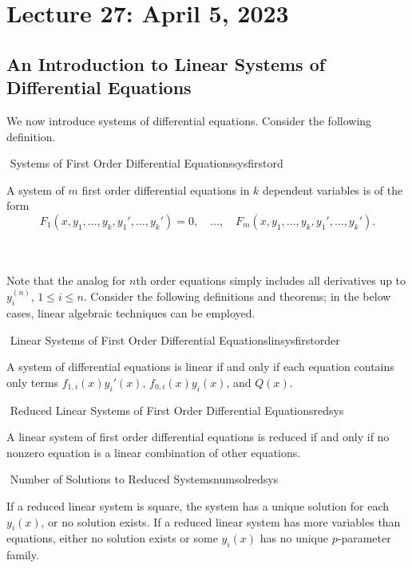 \section{Lecture 27: April 5, 2023}

    \subsection{An Introduction to Linear Systems of Differential Equations}

    We now introduce systems of differential equations. Consider the following definition.
    \begin{definition}{\Stop\,\,Systems of First Order Differential Equations}{sysfirstord}

        A system of \(m\) first order differential equations in \(k\) dependent variables is of the form
        \begin{equation*}
            F_1(x,y_1,\ldots,y_k,y_1',\ldots,y_k')=0,\quad \ldots,\quad F_m(x,y_1,\ldots,y_k,y_1',\ldots,y_k').
        \end{equation*}
        
    \end{definition}
    \vphantom
    \\
    \\
    Note that the analog for \(n\)th order equations simply includes all derivatives up to \(y_i^{(n)}\), \(1\leq i\leq n\). Consider the following definitions and theorems; in the below cases, linear algebraic techniques can be employed.
    \begin{definition}{\Stop\,\,Linear Systems of First Order Differential Equations}{linsysfirstorder}

        A system of differential equations is linear if and only if each equation contains only terms \(f_{1,i}(x)y_i'(x)\), \(f_{0,i}(x)y_i(x)\), and \(Q(x)\).
        
    \end{definition}
    \begin{definition}{\Stop\,\,Reduced Linear Systems of First Order Differential Equations}{redsys}

        A linear system of first order differential equations is reduced if and only if no nonzero equation is a linear combination of other equations.
        
    \end{definition}
    \begin{theorem}{\Stop\,\,Number of Solutions to Reduced Systems}{numsolredsys}

        If a reduced linear system is square, the system has a unique solution for each \(y_i(x)\), or no solution exists. If a reduced linear system has more variables than equations, either no solution exists or some \(y_i(x)\) has no unique \(p\)-parameter family.
        
    \end{theorem}
